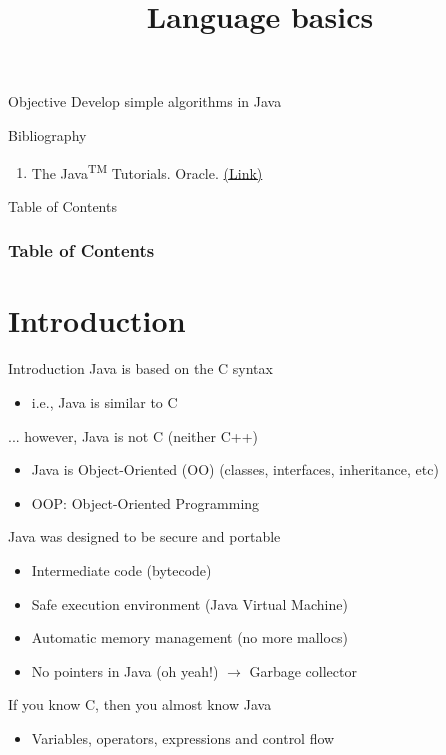 \documentclass[10pt,compress]{beamer} %
\title[Language basics]{Language basics}
\author{}
\institute{\asignatura}
\date{}
\begin{document}
{\titlepageBlue
    \begin{frame}
        \titlepage
    \end{frame}
}

\begin{frame}[plain]{}
   \begin{block}{Objective}
       Develop simple algorithms in Java
   \end{block}

   \begin{block}{Bibliography}
      \begin{enumerate}
          \item The Java\textsuperscript{TM} Tutorials. Oracle. \href{https://docs.oracle.com/javase/tutorial/}{(Link)}
      \end{enumerate} 
   \end{block}

\end{frame}

{
\begin{frame}[shrink]{Table of Contents}
 \frametitle{Table of Contents}
 \tableofcontents
\end{frame}
}

\section{Introduction}
\begin{frame}{Introduction}
	Java is based on the C syntax
		\begin{itemize}
		\item i.e., Java is similar to C
		\end{itemize}
	... however, Java is not C (neither C++)
		\begin{itemize}
		\item Java is Object-Oriented (OO) (classes, interfaces, inheritance, etc)
		\item OOP: Object-Oriented Programming
		\end{itemize}
	Java was designed to be secure and portable
		\begin{itemize}
		\item Intermediate code (bytecode)
		\item Safe execution environment (Java Virtual Machine)
		\item Automatic memory management (no more mallocs)
		\item No pointers in Java (oh yeah!) $\rightarrow$ \alert{Garbage collector}
		\end{itemize}
	If you know C, then you almost know Java
		\begin{itemize}
		\item Variables, operators, expressions and control flow
		\end{itemize}
\end{frame}
\end{document}

